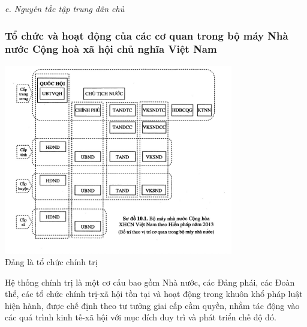 \documentclass[12pt, a4paper]{article}
\begin{document}
\textit{e. Nguyên tắc tập trung dân chủ}
\subsubsection{Tổ chức và hoạt động của các cơ quan trong bộ máy Nhà nước Cộng hoà xã hội chủ nghĩa Việt Nam}
\begin{center}
  \includegraphics[width = 0.75\textwidth]{./image/3.png}\\
  Đảng là tổ chức chính trị
\end{center}

Hệ thống chính trị là một cơ cấu bao gồm Nhà nước, các Đảng phái, các Đoàn thể, các tổ chức chính trị-xã hội tồn tại và hoạt động trong khuôn khổ pháp luật hiện hành, được chế định theo tư tưởng giai cấp cầm quyền, nhằm tác động vào các quá trình kinh tế-xã hội với mục đích duy trì và phát triển chế độ đó.
\end{document}
